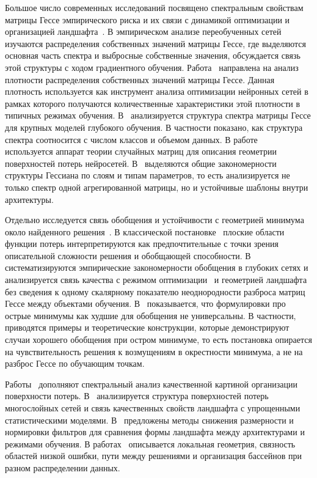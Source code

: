 \documentclass[11pt]{ubs}
\begin{document}
Большое число современных исследований посвящено спектральным свойствам матрицы Гессе эмпирического риска и их связи с динамикой оптимизации и организацией ландшафта~\cite{sagun2018,ghorbani2019,papyan2019,pennington2017,wu2022dissecting}.
В эмпирическом анализе переобученных сетей~\cite{sagun2018} изучаются распределения собственных значений матрицы Гессе, где выделяются основная часть спектра и выбросные собственные значения, обсуждается связь этой структуры с ходом градиентного обучения.
Работа~\cite{ghorbani2019} направлена на анализ плотности распределения собственных значений матрицы Гессе.
Данная плотность используется как инструмент анализа оптимизации нейронных сетей в рамках которого получаются количественные характеристики этой плотности в типичных режимах обучения.
В~\cite{papyan2019} анализируется структура спектра матрицы Гессе для крупных моделей глубокого обучения.
В частности показано, как структура спектра соотносится с числом классов и объемом данных.
В работе~\cite{pennington2017} используется аппарат теории случайных матриц для описания геометрии поверхностей потерь нейросетей.
В~\cite{wu2022dissecting} выделяются общие закономерности структуры Гессиана по слоям и типам параметров, то есть анализируется не только спектр одной агрегированной матрицы, но и устойчивые шаблоны внутри архитектуры.

Отдельно исследуется связь обобщения и устойчивости с геометрией минимума около найденного решения~\cite{hochreiter1994,neyshabur2017exploring,dinh2017sharp}.
В классической постановке~\cite{hochreiter1994} плоские области функции потерь интерпретируются как предпочтительные с точки зрения описательной сложности решения и обобщающей способности.
В~\cite{neyshabur2017exploring} систематизируются эмпирические закономерности обобщения в глубоких сетях и анализируется связь качества с режимом оптимизации~\cite{hochreiter1994} и геометрией ландшафта без сведения к одному скалярному показателю неоднородности разброса матриц Гессе между объектами обучения.
В~\cite{dinh2017sharp} показывается, что формулировки про острые минимумы как худшие для обобщения не универсальны.
В частности, приводятся примеры и теоретические конструкции, которые демонстрируют случаи хорошего обобщения при остром минимуме, то есть постановка опирается на чувствительность решения к возмущениям в окрестности минимума, а не на разброс Гессе по обучающим точкам.

Работы~\cite{choromanska2015,li2018visualizing,fort2019emergent,fort2019large} дополняют спектральный анализ качественной картиной организации поверхности потерь.
В~\cite{choromanska2015} анализируется структура поверхностей потерь многослойных сетей и связь качественных свойств ландшафта с упрощенными статистическими моделями.
В~\cite{li2018visualizing} предложены методы снижения размерности и нормировки фильтров для сравнения формы ландшафта между архитектурами и режимами обучения.
В работах~\cite{fort2019emergent,fort2019large} описывается локальная геометрия, связность областей низкой ошибки, пути между решениями и организация бассейнов при разном распределении данных.
\end{document}
